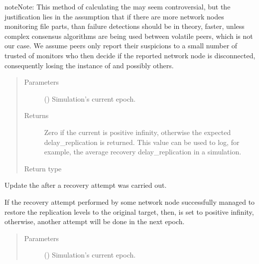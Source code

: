 \documentclass[letterpaper,10pt,english]{sphinxmanual}
\begin{document}
\begin{fulllineitems}
\begin{fulllineitems}
\begin{sphinxadmonition}{note}{Note:}
This method of calculating the  may seem
controversial, but the justification lies in the assumption that
if there are more network nodes monitoring file parts,
than failure detections should be in theory, faster, unless
complex consensus algorithms are being used between volatile
peers, which is not our case. We assume peers only report their
suspicions to a small number of trusted of monitors who then
decide if the reported network node is disconnected, consequently
losing the instance of  and possibly others.
\end{sphinxadmonition}
\begin{quote}\begin{description}
\item[{Parameters}] \leavevmode
{} () \textendash{} Simulation’s current epoch.

\item[{Returns}] \leavevmode
Zero if the current  is positive infinity,
otherwise the expected delay\_replication is returned. This value
can be used to log, for example, the average recovery
delay\_replication in a simulation.

\item[{Return type}] \leavevmode
{}

\end{description}\end{quote}

\end{fulllineitems}


\begin{fulllineitems}
\label{\detokenize{app.domain.helpers:app.domain.helpers.smart_dataclasses.FileBlockData.update_epochs_to_recover}}
Update the  after a recovery attempt was carried out.

If the recovery attempt performed by some network node successfully
managed to restore the replication levels to the original target, then,
 is set to positive infinity, otherwise, another
attempt will be done in the next epoch.
\begin{quote}\begin{description}
\item[{Parameters}] \leavevmode
{} () \textendash{} Simulation’s current epoch.


\end{description}
\end{quote}
\end{fulllineitems}
\end{fulllineitems}
\end{document}
